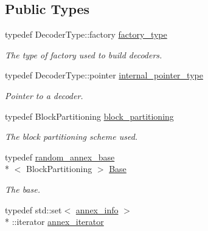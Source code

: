 \subsection*{Public Types}
\begin{DoxyCompactItemize}
\item 
\hypertarget{classkodo_1_1random__annex__decoder_a68e1a5fbc7128fe60d8905e0ec0fc83c}{typedef Decoder\-Type\-::factory \hyperlink{classkodo_1_1random__annex__decoder_a68e1a5fbc7128fe60d8905e0ec0fc83c}{factory\-\_\-type}}\label{classkodo_1_1random__annex__decoder_a68e1a5fbc7128fe60d8905e0ec0fc83c}

\begin{DoxyCompactList}\small\item\em The type of factory used to build decoders. \end{DoxyCompactList}\item 
\hypertarget{classkodo_1_1random__annex__decoder_adbc8e1eb9e3b31cd1461d375cb3e6b2f}{typedef Decoder\-Type\-::pointer \hyperlink{classkodo_1_1random__annex__decoder_adbc8e1eb9e3b31cd1461d375cb3e6b2f}{internal\-\_\-pointer\-\_\-type}}\label{classkodo_1_1random__annex__decoder_adbc8e1eb9e3b31cd1461d375cb3e6b2f}

\begin{DoxyCompactList}\small\item\em Pointer to a decoder. \end{DoxyCompactList}\item 
\hypertarget{classkodo_1_1random__annex__decoder_a7f51485decbfc15960dcc266f82beed0}{typedef Block\-Partitioning \hyperlink{classkodo_1_1random__annex__decoder_a7f51485decbfc15960dcc266f82beed0}{block\-\_\-partitioning}}\label{classkodo_1_1random__annex__decoder_a7f51485decbfc15960dcc266f82beed0}

\begin{DoxyCompactList}\small\item\em The block partitioning scheme used. \end{DoxyCompactList}\item 
\hypertarget{classkodo_1_1random__annex__decoder_ae9f03beed282a957f0ab4affe1d224d7}{typedef \hyperlink{classkodo_1_1random__annex__base}{random\-\_\-annex\-\_\-base}\\*
$<$ Block\-Partitioning $>$ \hyperlink{classkodo_1_1random__annex__decoder_ae9f03beed282a957f0ab4affe1d224d7}{Base}}\label{classkodo_1_1random__annex__decoder_ae9f03beed282a957f0ab4affe1d224d7}

\begin{DoxyCompactList}\small\item\em The base. \end{DoxyCompactList}\item 
\hypertarget{classkodo_1_1random__annex__decoder_a6cd2a7b5e4aa6e0fc3970faeda0448a8}{typedef std\-::set$<$ \hyperlink{structkodo_1_1annex__info}{annex\-\_\-info} $>$\\*
\-::iterator \hyperlink{classkodo_1_1random__annex__decoder_a6cd2a7b5e4aa6e0fc3970faeda0448a8}{annex\-\_\-iterator}}\label{classkodo_1_1random__annex__decoder_a6cd2a7b5e4aa6e0fc3970faeda0448a8}


\end{DoxyCompactItemize}
